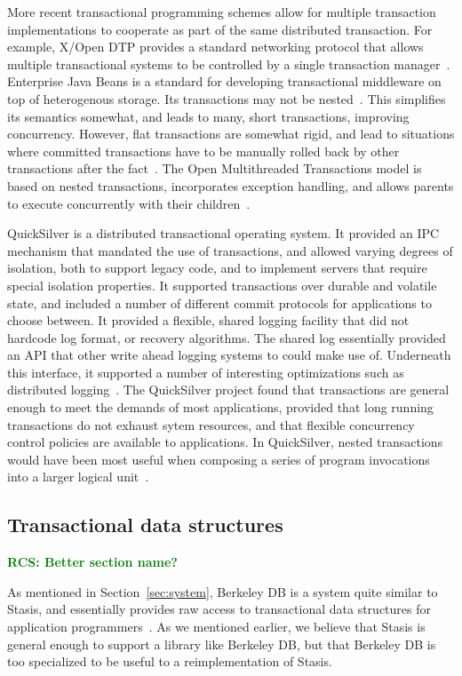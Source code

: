 \documentclass[letterpaper,twocolumn,10pt]{article}
\newcommand{\yad}{Stasis\xspace}
\newcommand{\rcs}[1]{\textcolor{green}{\bf RCS: #1}}
\begin{document}
More recent transactional programming schemes allow for multiple
transaction implementations to cooperate as part of the same
distributed transaction.  For example, X/Open DTP provides a standard
networking protocol that allows multiple transactional systems to be
controlled by a single transaction manager~\cite{something}.
Enterprise Java Beans is a standard for developing transactional
middleware on top of heterogenous storage.  Its
transactions may not be nested~\cite{something}.  This simplifies its
semantics somewhat, and leads to many, short transactions, 
improving concurrency.  However, flat transactions are somewhat rigid, and lead to
situations where committed transactions have to be manually rolled
back by other transactions after the fact~\cite{ejbCritique}.  The Open
Multithreaded Transactions model is based on nested transactions,
incorporates exception handling, and allows parents to execute
concurrently with their children~\cite{omtt}.

QuickSilver is a distributed transactional operating system.  It
provided an IPC mechanism that mandated the use of transactions, and
allowed varying degrees of isolation, both to support legacy code, and
to implement servers that require special isolation properties.  It
supported transactions over durable and volatile state, and included a
number of different commit protocols for applications to choose
between.  It provided a flexible, shared logging facility that did not
hardcode log format, or recovery algorithms.  The shared log
essentially provided an API that other write ahead logging systems to
could make use of.  Underneath this interface, it supported a number
of interesting optimizations such as distributed
logging~\cite{recoveryInQuickSilver}.  The QuickSilver project found
that transactions are general enough to meet the demands of most
applications, provided that long running transactions do not exhaust
sytem resources, and that flexible concurrency control policies are
available to applications.  In QuickSilver, nested transactions would
have been most useful when composing a series of program invocations
into a larger logical unit~\cite{experienceWithQuickSilver}.

\subsection{Transactional data structures}

\rcs{Better section name?}

As mentioned in Section~\ref{sec:system}, Berkeley DB is a system
quite similar to \yad, and essentially provides raw access to
transactional data structures for application
programmers~\cite{libtp}.  As we mentioned earlier, we believe that
\yad is general enough to support a library like Berkeley DB, but that
Berkeley DB is too specialized to be useful to a reimplementation of
\yad.
\end{document}
